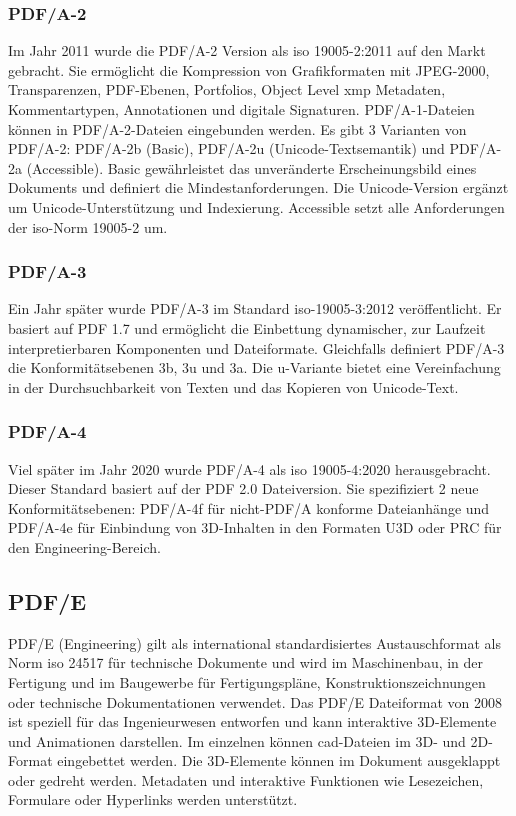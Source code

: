 \subsubsection{PDF/A-2}
Im Jahr 2011 wurde die PDF/A-2 Version als \gls{iso} 19005-2:2011 auf den Markt gebracht. Sie ermöglicht die Kompression von Grafikformaten mit JPEG-2000, Transparenzen, PDF-Ebenen, Portfolios, Object Level \gls{xmp} Metadaten, Kommentartypen, Annotationen und digitale Signaturen. \cite{proj-consult} PDF/A-1-Dateien können in PDF/A-2-Dateien eingebunden werden. Es gibt 3 Varianten von PDF/A-2: PDF/A-2b (Basic), PDF/A-2u (Unicode-Textsemantik) und PDF/A-2a (Accessible). Basic gewährleistet das unveränderte Erscheinungsbild eines Dokuments und definiert die Mindestanforderungen. Die Unicode-Version ergänzt um Unicode-Unterstützung und Indexierung. Accessible setzt alle Anforderungen der \gls{iso}-Norm 19005-2 um. \cite{adobe-pdf-a}

\subsubsection{PDF/A-3}
Ein Jahr später wurde PDF/A-3 im Standard \gls{iso}-19005-3:2012 veröffentlicht. Er basiert auf PDF 1.7 und ermöglicht die Einbettung dynamischer, zur Laufzeit interpretierbaren Komponenten und Dateiformate. Gleichfalls definiert PDF/A-3 die Konformitätsebenen 3b, 3u und 3a. Die u-Variante bietet eine Vereinfachung in der Durchsuchbarkeit von Texten und das Kopieren von Unicode-Text. \cite{proj-consult}

\subsubsection{PDF/A-4}
Viel später im Jahr 2020 wurde PDF/A-4 als \gls{iso} 19005-4:2020 herausgebracht. Dieser Standard basiert auf der PDF 2.0 Dateiversion. Sie spezifiziert 2 neue Konformitätsebenen: PDF/A-4f für nicht-PDF/A konforme Dateianhänge und PDF/A-4e für Einbindung von 3D-Inhalten in den Formaten U3D oder PRC für den Engineering-Bereich. \cite{proj-consult}


\subsection{PDF/E}
PDF/E (Engineering) gilt als international standardisiertes Austauschformat als Norm \gls{iso} 24517 für technische Dokumente und wird im Maschinenbau, in der Fertigung und im Baugewerbe für Fertigungspläne, Konstruktionszeichnungen oder technische Dokumentationen verwendet. Das PDF/E Dateiformat von 2008 ist speziell für das Ingenieurwesen entworfen und kann interaktive 3D-Elemente und Animationen darstellen. Im einzelnen können \gls{cad}-Dateien im 3D- und 2D-Format eingebettet werden. Die 3D-Elemente können im Dokument ausgeklappt oder gedreht werden. Metadaten und interaktive Funktionen wie Lesezeichen, Formulare oder Hyperlinks werden unterstützt. \cite{adobe-pdf-e}


